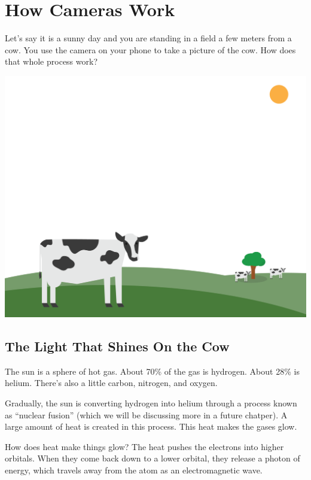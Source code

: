 \chapter{How Cameras Work}

Let's say it is a sunny day and you are standing in a field a few meters
from a cow. You use the camera on your phone to take a picture of the
cow. How does that whole process work?

\includegraphics[width=1\textwidth]{cow1.png}


\section{The Light That Shines On the Cow}

The sun is a sphere of hot gas. About 70\% of the gas is
hydrogen. About 28\% is helium. There's also a little carbon, nitrogen,
and oxygen.

Gradually, the sun is converting hydrogen into helium through a
process known as ``nuclear fusion'' (which we will be discussing more in a future chatper). A large amount of heat is created in this
process. This heat makes the gases glow.

How does heat make things glow? The heat pushes the electrons into
higher orbitals.  When they come back down to a lower orbital, they
release a photon of energy, which travels away from the atom as an
electromagnetic wave.

